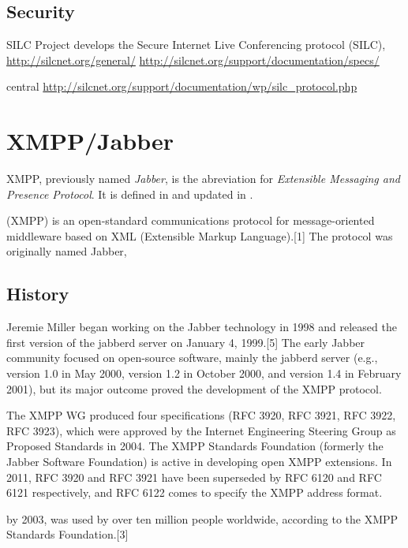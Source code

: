 \subsection{Security}

SILC Project develops the Secure Internet Live Conferencing protocol (SILC),
\url{http://silcnet.org/general/}
\url{http://silcnet.org/support/documentation/specs/}

central
\url{http://silcnet.org/support/documentation/wp/silc_protocol.php}


\section{XMPP/Jabber}
XMPP, previously named \textit{Jabber}, is the abreviation for
\textit{Extensible Messaging and Presence Protocol}.
It is defined in \cite{rfc3920,rfc3921,rfc3922,rfc3923,rfc4622,rfc4854,rfc4979}
and updated in \cite{rfc6120,rfc6121}.

(XMPP) is an open-standard communications protocol for message-oriented middleware based on XML (Extensible Markup Language).[1] The protocol was originally named Jabber,



\subsection{History}
Jeremie Miller began working on the Jabber technology in 1998 and released the first version of the jabberd server on January 4, 1999.[5] The early Jabber community focused on open-source software, mainly the jabberd server (e.g., version 1.0 in May 2000, version 1.2 in October 2000, and version 1.4 in February 2001), but its major outcome proved the development of the XMPP protocol.

The XMPP WG produced four specifications (RFC 3920, RFC 3921, RFC 3922, RFC 3923), which were approved by the Internet Engineering Steering Group as Proposed Standards in 2004. The XMPP Standards Foundation (formerly the Jabber Software Foundation) is active in developing open XMPP extensions. In 2011, RFC 3920 and RFC 3921 have been superseded by RFC 6120 and RFC 6121 respectively, and RFC 6122 comes to specify the XMPP address format.

by 2003, was used by over ten million people worldwide, according to the XMPP Standards Foundation.[3]

